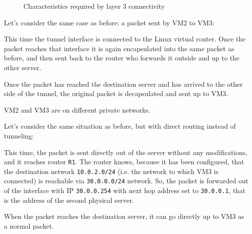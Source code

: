 \begin{figure}[h!]
    \centering
    \caption{Characteristics required by layer 3 connectivity}
\end{figure}

\begin{eg}
    Let's consider the same case as before: a packet sent by VM2 to VM3:

    \begin{figure}[h!]
        \centering
    \end{figure}

    \noindent
    This time the tunnel interface is connected to the Linux virtual router. Once
    the packet reaches that interface it is again encapsulated into the same
    packet as before, and then sent back to the router who forwards it outside
    and up to the other server.

    \newpage
    \begin{figure}[ht!]
        \centering
    \end{figure}

    \noindent
    Once the packet has reached the destination server and has arrived to the other
    side of the tunnel, the original packet is decapsulated and sent up to VM3.
\end{eg}
\begin{note}
    VM2 and VM3 are on different private networks.
\end{note}

\begin{eg}
    Let's consider the same situation as before, but with direct routing instead
    of tunneling:

    \begin{figure}[h!]
        \centering
    \end{figure}

    \noindent
    This time, the packet is sent directly out of the server without any
    modifications, and it reaches router \texttt{R1}. The router knows, because
    it has been configured, that the destination network \texttt{10.0.2.0/24}
    (i.e. the network to which VM3 is connected) is reachable via \texttt{30.0.0.0/24}
    network. So, the packet is forwarded out of the interface with IP
    \texttt{30.0.0.254} with next hop address set to \texttt{30.0.0.1}, that is
    the address of the second physical server.

    \bigskip\noindent
    When the packet reaches the destination server, it can go directly up to
    VM3 as a normal packet.

    \newpage
    \begin{figure}[ht!]
        \centering
    \end{figure}
\end{eg}

